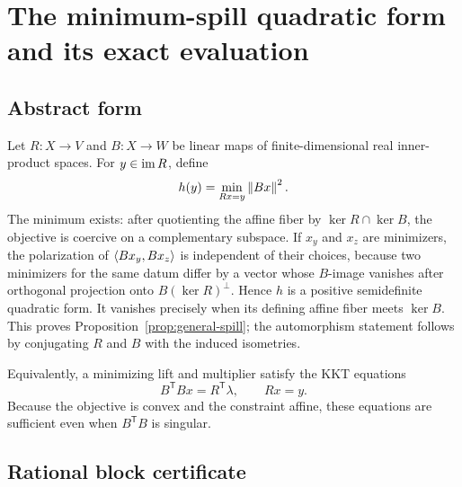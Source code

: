 \section{The minimum-spill quadratic form and its exact evaluation}
\label{app:spill}

\subsection{Abstract form}

Let $R:X\to V$ and $B:X\to W$ be linear maps of finite-dimensional real
inner-product spaces.  For $y\in\operatorname{im} R$, define
\[
 h(y)=\min_{Rx=y}\left\lVert Bx\right\rVert^2.
\]
The minimum exists: after quotienting the affine fiber by
$\ker R\cap\ker B$, the objective is coercive on a complementary subspace.
If $x_y$ and $x_z$ are minimizers, the polarization of
$\left\langle Bx_y,Bx_z\right\rangle$ is independent of their choices, because two minimizers for
the same datum differ by a vector whose $B$-image vanishes after orthogonal
projection onto $B(\ker R)^\perp$.  Hence $h$ is a positive semidefinite
quadratic form.  It vanishes precisely when its defining affine fiber meets
$\ker B$.  This proves Proposition~\ref{prop:general-spill}; the automorphism
statement follows by conjugating $R$ and $B$ with the induced isometries.

Equivalently, a minimizing lift and multiplier satisfy the KKT equations
\begin{equation}
\label{eq:kkt-general}
 B^\mathsf TBx=R^\mathsf T\lambda,
 \qquad Rx=y.
\end{equation}
Because the objective is convex and the constraint affine, these equations
are sufficient even when $B^\mathsf TB$ is singular.

\subsection{Rational block certificate}

